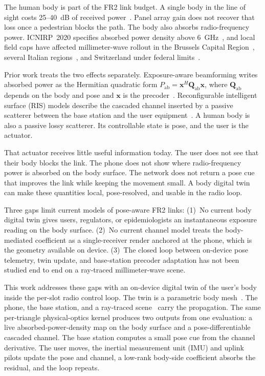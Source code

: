\documentclass[journal,twocolumn,10pt]{IEEEtran}
\theoremstyle{plain}
\theoremstyle{definition}
\theoremstyle{remark}
\newcommand{\xx}{\mathbf{x}}
\newcommand{\Pabs}{P_{\mathrm{ab}}}
\newcommand{\Qabs}{\mathbf{Q}_{\mathrm{ab}}}
\begin{document}
The human body is part of the FR2 link budget. A single body in the
line of sight costs 25--40~dB of received
power~\cite{Maccartney2017blockage,MacCartney2017}. Panel array gain
does not recover that loss once a pedestrian blocks the path. The body
also absorbs radio-frequency power. ICNIRP~2020 specifies absorbed
power density above 6~GHz~\cite{ICNIRP2020}, and local field caps have
affected millimeter-wave rollout in the Brussels Capital
Region~\cite{BrusselsArrete2007,BrusselsArrete2024}, several Italian
regions~\cite{ItalyDL}, and Switzerland under federal
limits~\cite{SwissNISV2000}.

Prior work treats the two effects separately. Exposure-aware
beamforming writes absorbed power as the Hermitian quadratic form
$\Pabs=\xx^{H}\Qabs\xx$, where $\Qabs$ depends on the body and pose
and $\xx$ is the precoder~\cite{Hochwald2014,Ying2015,Ying2017}.
Reconfigurable intelligent surface (RIS) models describe the cascaded
channel inserted by a passive scatterer between the base station and
the user equipment~\cite{DiRenzo2020,Wu2019}. A human body is also a
passive lossy scatterer. Its controllable state is pose, and the user
is the actuator.

That actuator receives little useful information today. The user does
not see that their body blocks the link. The phone does not show where
radio-frequency power is absorbed on the body surface. The network
does not return a pose cue that improves the link while keeping the
movement small. A body digital twin can make these quantities local,
pose-resolved, and usable in the radio loop.

Three gaps limit current models of pose-aware FR2 links:
(1)~No current body digital twin gives users, regulators, or
epidemiologists an instantaneous exposure reading on the body surface.
(2)~No current channel model treats the body-mediated coefficient as a
single-receiver render anchored at the phone, which is the geometry
available on device. (3)~The closed loop between on-device pose
telemetry, twin update, and base-station precoder adaptation has not
been studied end to end on a ray-traced millimeter-wave scene.

This work addresses these gaps with an on-device digital twin of the
user's body inside the per-slot radio control loop. The twin is a
parametric body mesh~\cite{SMPLX2019}. The phone, the base station,
and a ray-traced scene~\cite{Hoydis2023Sionna} carry the propagation.
The same per-triangle physical-optics kernel produces two outputs from
one evaluation: a live absorbed-power-density map on the body surface
and a pose-differentiable cascaded channel. The base station computes
a small pose cue from the channel derivative. The user moves, the
inertial measurement unit (IMU) and uplink pilots update the pose and
channel, a low-rank body-side coefficient absorbs the residual, and
the loop repeats.
\end{document}
